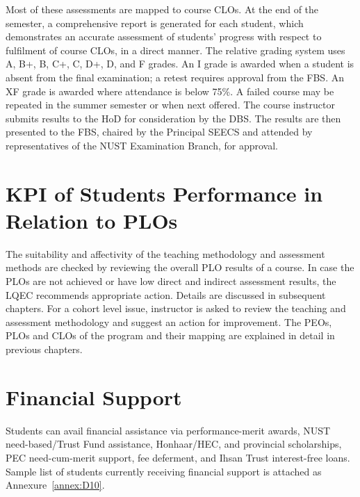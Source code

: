 Most of these assessments are mapped to course CLOs. At the end of the semester, a comprehensive report is generated for each student, which demonstrates an accurate assessment of students' progress with respect to fulfilment of course CLOs, in a direct manner. The relative grading system uses A, B+, B, C+, C, D+, D, and F grades. An I grade is awarded when a student is absent from the final examination; a retest requires approval from the FBS. An XF grade is awarded where attendance is below 75\%. A failed course may be repeated in the summer semester or when next offered. The course instructor submits results to the HoD for consideration by the DBS. The results are then presented to the FBS, chaired by the Principal SEECS and attended by representatives of the NUST Examination Branch, for approval.

\section{KPI of Students Performance in Relation to PLOs}
\label{sec:kpi-plo}

The suitability and affectivity of the teaching methodology and assessment methods are checked by reviewing the overall PLO results of a course. In case the PLOs are not achieved or have low direct and indirect assessment results, the LQEC recommends appropriate action. Details are discussed in subsequent chapters. For a cohort level issue, instructor is asked to review the teaching and assessment methodology and suggest an action for improvement. The PEOs, PLOs and CLOs of the program and their mapping are explained in detail in previous chapters.

\section{Financial Support}
\label{sec:fin}
Students can avail financial assistance via performance-merit awards, NUST need-based/Trust Fund assistance, Honhaar/HEC, and provincial scholarships, PEC need-cum-merit support, fee deferment, and Ihsan Trust interest-free loans. Sample list of students currently receiving financial support is attached as Annexure~\ref{annex:D10}.




